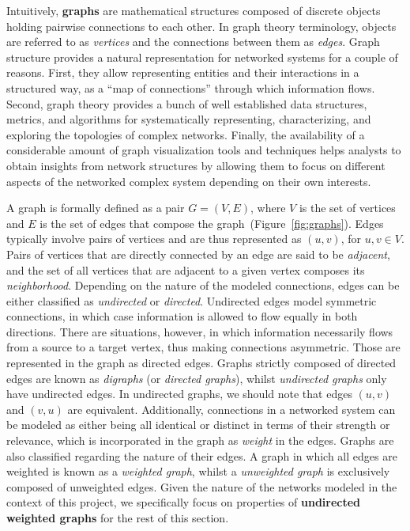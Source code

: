 Intuitively, \textbf{graphs} are mathematical structures composed of discrete objects holding pairwise connections to each other. 
In graph theory terminology, objects are referred to as \textit{vertices} and the connections between them as \textit{edges}.
Graph structure provides a natural representation for networked systems for a couple of reasons.
First, they allow representing entities and their interactions in a structured way, as a ``map of connections'' through which information flows.
Second, graph theory provides a bunch of well established data structures, metrics, and algorithms for systematically representing, characterizing, and exploring the topologies of complex networks.
Finally, the availability of a considerable amount of graph visualization tools and techniques helps analysts to obtain insights from network structures by allowing them to focus on different aspects of the networked complex system depending on their own interests.


A graph is formally defined as a pair $G=(V,E)$, where $V$ is the set of vertices and $E$ is the set of edges that compose the graph~(Figure~\ref{fig:graphs}). 
%
Edges typically involve pairs of vertices and are thus represented as $(u,v)$, for $u,v \in V$.
Pairs of vertices that are directly connected by an edge are said to be \textit{adjacent}, and the set of all vertices that are adjacent to a given vertex composes its \textit{neighborhood}.
%
Depending on the nature of the modeled connections, edges can be either classified as \textit{undirected} or \textit{directed}.
Undirected edges model symmetric connections, in which case information is allowed to flow equally in both directions.
There are situations, however, in which information necessarily flows from a source to a target vertex, thus making connections asymmetric.
Those are represented in the graph as directed edges.
Graphs strictly composed of directed edges are known as \textit{digraphs} (or \textit{directed graphs}), whilst \textit{undirected graphs} only have undirected edges.
In undirected graphs, we should note that edges $(u,v)$ and $(v,u)$ are equivalent.
%
Additionally, connections in a networked system can be modeled as either being all identical or distinct in terms of their strength or relevance, which is incorporated in the graph as \textit{weight} in the edges.
Graphs are also classified regarding the nature of their edges.
A graph in which all edges are weighted is known as a \textit{weighted graph}, whilst a \textit{unweighted graph} is exclusively composed of unweighted edges.
%
Given the nature of the networks modeled in the context of this project, we specifically focus on properties of \textbf{undirected weighted graphs} for the rest of this section.



